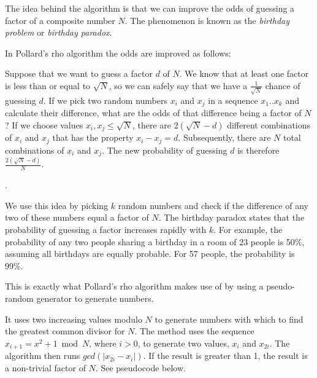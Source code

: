\documentclass[paper=a4, fontsize=11pt,numbers=endperiod]{scrartcl} %
\providecommand{\abs}[1]{\lvert#1\rvert} %
\numberwithin{equation}{section} %
\numberwithin{figure}{section} %
\numberwithin{table}{section} %
\begin{document}
The idea behind the algorithm is that we can improve the odds of guessing a factor of a composite number $N$.
The phenomenon is known as the \emph{birthday problem} or \emph{birthday paradox}\cite{birthday}.

In Pollard's rho algorithm the odds are improved as follows:

Suppose that we want to guess a factor $d$ of $N$.
We know that at least one factor is less than or equal to $\sqrt{N}$, so we can safely say that we have a $\frac{1}{\sqrt{N}}$ chance of guessing $d$.
If we pick two random numbers $x_i$ and $x_j$ in a sequence $x_1 .. x_k$ and calculate their difference, what are the odds of that difference being a factor of $N$?
If we choose values $x_i, x_j \leq \sqrt{N}$, there are  $2(\sqrt{N}-d)$ different combinations of $x_i$ and $x_j$ that has the property $x_i - x_j = d$.
Subsequently, there are $N$ total combinations of $x_i$ and $x_j$.
The new probability of guessing $d$ is therefore $\frac{2(\sqrt{N}-d)}{N}$. 

.\cite{colorado}

We use this idea by picking $k$ random numbers and check if the difference of any two of these numbers equal a factor of $N$.
The birthday paradox states that the probability of guessing a factor increases rapidly with $k$.
For example, the probability of any two people sharing a birthday in a room of 23 people is 50\%, assuming all birthdays are equally probable.
For 57 people, the probability is 99\%.

This is exactly what Pollard's rho algorithm makes use of by using a pseudo-random generator to generate numbers.

It uses two increasing values modulo $N$ to generate numbers with which to find the greatest common divisor for $N$.
The method uses the sequence $x_{i+1} = x^2 + 1 \bmod N$, where $i > 0$, to generate two values, $x_i$ and $x_{2i}$.
The algorithm then runs $gcd(\abs{x_{2i}-x_i})$.
If the result is greater than 1, the result is a non-trivial factor of $N$.
See pseudocode below.
\end{document}
